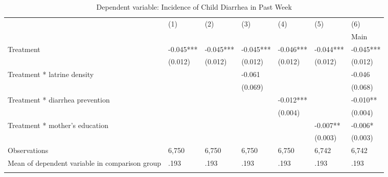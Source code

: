 \begin{table}[tbp] \centering
{}

\caption{Dependent variable: Incidence of Child Diarrhea in Past Week}
{\tiny
\begin{tabularx}{\textwidth}{lCCCCCC}

\toprule
&{(1)}&{(2)}&{(3)}&{(4)}&{(5)}&{(6)} \tabularnewline
{}&{}&{}&{}&{}&{}&{Main} \tabularnewline
\midrule\addlinespace[1.5ex]
Treatment&-0.045***&-0.045***&-0.045***&-0.046***&-0.044***&-0.045*** \tabularnewline
&(0.012)&(0.012)&(0.012)&(0.012)&(0.012)&(0.012) \tabularnewline
Treatment * latrine density&&&-0.061&&&-0.046 \tabularnewline
&&&(0.069)&&&(0.068) \tabularnewline
Treatment * diarrhea prevention&&&&-0.012***&&-0.010** \tabularnewline
&&&&(0.004)&&(0.004) \tabularnewline
Treatment * mother's education&&&&&-0.007**&-0.006* \tabularnewline
&&&&&(0.003)&(0.003) \tabularnewline
\midrule Observations&6,750&6,750&6,750&6,750&6,742&6,742 \tabularnewline
Mean of dependent variable in comparison group&.193&.193&.193&.193&.193&.193 \tabularnewline
\bottomrule \addlinespace[1.5ex]

\end{tabularx}
}
\end{table}

